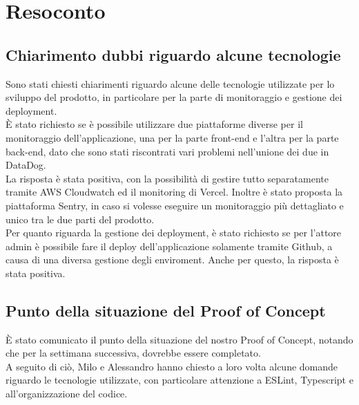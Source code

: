 \section{Resoconto}
\subsection{Chiarimento dubbi riguardo alcune tecnologie}

Sono stati chiesti chiarimenti riguardo alcune delle tecnologie utilizzate per lo sviluppo del prodotto, in particolare per la parte di monitoraggio e gestione dei deployment.\\

È stato richiesto se è possibile utilizzare due piattaforme diverse per il monitoraggio dell'applicazione, una per la parte front-end e l'altra per la parte back-end, dato che sono stati riscontrati vari problemi nell'unione dei due in DataDog. \\
La risposta è stata positiva, con la possibilità di gestire tutto separatamente tramite AWS Cloudwatch ed il monitoring di Vercel. Inoltre è stato proposta la piattaforma Sentry, in caso si volesse eseguire un monitoraggio più dettagliato e unico tra le due parti del prodotto.\\

Per quanto riguarda la gestione dei deployment, è stato richiesto se per l'attore admin è possibile fare il deploy dell'applicazione solamente tramite Github, a causa di una diversa gestione degli enviroment. Anche per questo, la risposta è stata positiva.
  
\subsection{Punto della situazione del Proof of Concept}

È stato comunicato il punto della situazione del nostro Proof of Concept, notando che per la settimana successiva, dovrebbe essere completato. \\A seguito di ciò, Milo e Alessandro hanno chiesto a loro volta alcune domande riguardo le tecnologie utilizzate, con particolare attenzione a ESLint, Typescript e all'organizzazione del codice.
